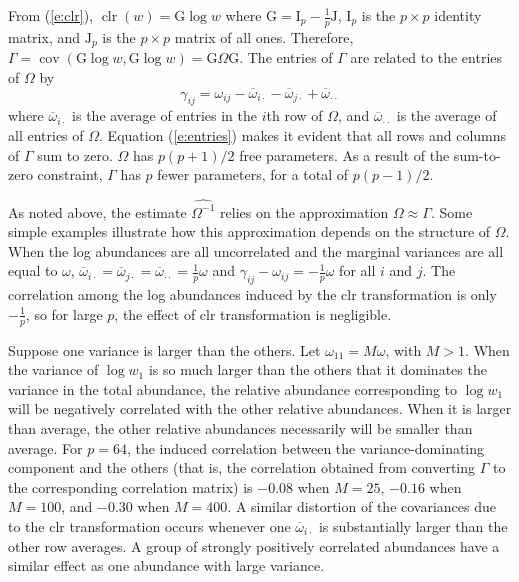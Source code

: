 \documentclass[12pt]{article}
\newcommand{\clr}{\operatorname{clr}}
\newcommand{\cov}{\operatorname{cov}}
\begin{document}
From (\ref{e:clr}), $\clr(w) = \mathrm{G} \log w$ where $\mathrm{G} = \mathrm{I}_p - \frac{1}{p}\mathrm{J}$, $\mathrm{I}_p$ is the $p \times p$ identity matrix, and $\mathrm{J}_p$ is the $p \times p$ matrix of all ones. Therefore, $\Gamma = \cov(\mathrm{G} \log w, \mathrm{G} \log w) = \mathrm{G} \Omega \mathrm{G}$. The entries of $\Gamma$ are related to the entries of $\Omega$ by
\begin{equation}
\label{e:entries}
\gamma_{ij} = \omega_{ij} - \overline{\omega}_{i\cdot} - \overline{\omega}_{j\cdot} + \overline{\omega}_{\cdot\cdot}
\end{equation}
where $\overline{\omega}_{i\cdot}$ is the average of entries in the $i$th row of $\Omega$, and $\overline{\omega}_{\cdot\cdot}$ is the average of all entries of $\Omega$. Equation (\ref{e:entries}) makes it evident that all rows and columns of $\Gamma$ sum to zero. $\Omega$ has $p(p+1)/2$ free parameters. As a result of the sum-to-zero constraint, $\Gamma$ has $p$ fewer parameters, for a total of $p(p-1)/2$.

As noted above, the estimate $\widehat{\Omega^{-1}}$ relies on the approximation $\Omega \approx \Gamma$. Some simple examples illustrate how this approximation depends on the structure of $\Omega$. When the log abundances are all uncorrelated and the marginal variances are all equal to $\omega$, $\overline{\omega}_{i\cdot} = \overline{\omega}_{j\cdot} = \overline{\omega}_{\cdot\cdot} = \frac{1}{p}\omega$ and $\gamma_{ij} - \omega_{ij} = -\frac{1}{p}\omega$ for all $i$ and $j$. The correlation among the log abundances induced by the clr transformation is only $-\frac{1}{p}$, so for large $p$, the effect of clr transformation is negligible.

Suppose one variance is larger than the others. Let $\omega_{11} = M\omega$, with $M > 1$. When the variance of $\log w_1$ is so much larger than the others that it dominates the variance in the total abundance, the relative abundance corresponding to $\log w_1$ will be negatively correlated with the other relative abundances. When it is larger than average, the other relative abundances necessarily will be smaller than average. For $p = 64$, the induced correlation between the variance-dominating component and the others (that is, the correlation obtained from converting $\Gamma$ to the corresponding correlation matrix) is $-0.08$ when $M = 25$, $-0.16$ when $M = 100$, and $-0.30$ when $M = 400$. A similar distortion of the covariances due to the clr transformation occurs whenever one $\overline{\omega}_{i\cdot}$ is substantially larger than the other row averages. A group of strongly positively correlated abundances have a similar effect as one abundance with large variance.
\end{document}
